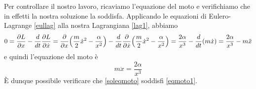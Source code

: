\begin{example}
    Per controllare il nostro lavoro, ricaviamo l'equazione del moto e verifichiamo che in effetti la nostra soluzione la soddisfa. Applicando le equazioni di Eulero-Lagrange \eqref{eullag} alla nostra Lagrangiana \eqref{lag1}, abbiamo
\begin{equation*}
    0 = \frac{\partial L}{\partial x}  - \frac{d}{dt} \frac{\partial L}{\partial\dot x} = \frac{\partial}{\partial x} \Big(\frac{m}{2} \dot x^2 - \frac{\alpha}{x^2} \Big) - \frac{d}{dt} \frac{\partial}{\partial\dot x} \Big(\frac{m}{2} \dot x^2 - \frac{\alpha}{x^2} \Big) = \frac{2 \alpha}{x^3} - \frac{d}{dt} (m \dot x) = \frac{2 \alpha}{x^3} - m \ddot x 
\end{equation*}
    e quindi l'equazione del moto è
\begin{equation}\label{eqmoto1}
    m \ddot x = \frac{2 \alpha}{x^3}
\end{equation}
    È dunque possibile verificare che \eqref{soleqmoto} soddisfi \eqref{eqmoto1}.
\end{example}

